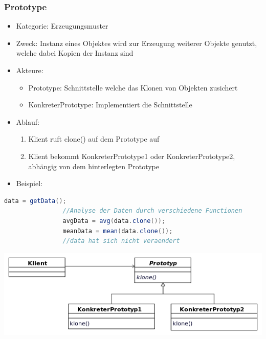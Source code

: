 \documentclass[11pt, fleqn, a4paper, leqno]{scrartcl} %
\begin{document}
		\subsubsection{Prototype}
			\begin{itemize}
				\item Kategorie: Erzeugungsmuster
				\item Zweck: Instanz eines Objektes wird zur Erzeugung weiterer Objekte genutzt, welche dabei Kopien der Instanz sind
				\item Akteure: 
					\begin{itemize}
						\item Prototype: Schnittstelle welche das Klonen von Objekten zusichert
						\item KonkreterPrototype: Implementiert die Schnittstelle
					\end{itemize}
				\item Ablauf:
					\begin{enumerate}
						\item Klient ruft clone() auf dem Prototype auf
						\item Klient bekommt KonkreterPrototype1 oder KonkreterPrototype2, abhängig von dem hinterlegten Prototype
					\end{enumerate}
				\item Beispiel: 
			\end{itemize}
			\begin{lstlisting}[frame=single,language=Java]
				data = getData();
				//Analyse der Daten durch verschiedene Functionen
				avgData = avg(data.clone());
				meanData = mean(data.clone());
				//data hat sich nicht veraendert
			\end{lstlisting}
			\includegraphics[scale=0.6]{images/prototype.png}
		\newpage		
\end{document}
